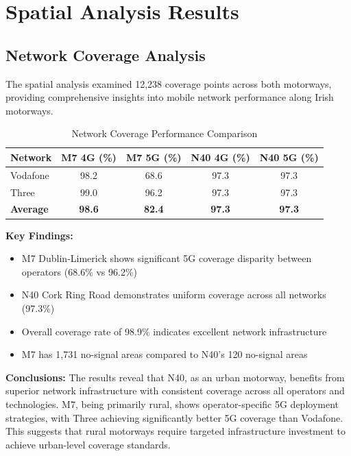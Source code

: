 \documentclass[MScCS]{uccthesis}
\begin{document}
\section{Spatial Analysis Results}

\subsection{Network Coverage Analysis}

The spatial analysis examined 12,238 coverage points across both motorways, providing comprehensive insights into mobile network performance along Irish motorways.

\begin{table}[h]
\centering
\caption{Network Coverage Performance Comparison}
\label{tab:network_coverage}
\begin{tabular}{|l|c|c|c|c|}
\hline
\textbf{Network} & \textbf{M7 4G (\%)} & \textbf{M7 5G (\%)} & \textbf{N40 4G (\%)} & \textbf{N40 5G (\%)} \\
\hline
Vodafone & 98.2 & 68.6 & 97.3 & 97.3 \\
\hline
Three & 99.0 & 96.2 & 97.3 & 97.3 \\
\hline
\textbf{Average} & \textbf{98.6} & \textbf{82.4} & \textbf{97.3} & \textbf{97.3} \\
\hline
\end{tabular}
\end{table}

\textbf{Key Findings:}
\begin{itemize}
\item M7 Dublin-Limerick shows significant 5G coverage disparity between operators (68.6\% vs 96.2\%)
\item N40 Cork Ring Road demonstrates uniform coverage across all networks (97.3\%)
\item Overall coverage rate of 98.9\% indicates excellent network infrastructure
\item M7 has 1,731 no-signal areas compared to N40's 120 no-signal areas
\end{itemize}

\textbf{Conclusions:} The results reveal that N40, as an urban motorway, benefits from superior network infrastructure with consistent coverage across all operators and technologies. M7, being primarily rural, shows operator-specific 5G deployment strategies, with Three achieving significantly better 5G coverage than Vodafone. This suggests that rural motorways require targeted infrastructure investment to achieve urban-level coverage standards.
\end{document}

